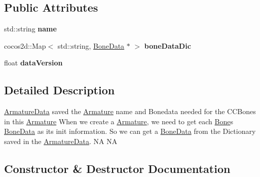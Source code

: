\subsection*{Public Attributes}
\begin{DoxyCompactItemize}
\item 
\mbox{\label{classcocostudio_1_1ArmatureData_a997df346d11f7e3be5c8aadd697f4727}} 
std\+::string {\bfseries name}
\item 
\mbox{\label{classcocostudio_1_1ArmatureData_a75a5e66549da2b70140418db0f3bff85}} 
cocos2d\+::\+Map$<$ std\+::string, \hyperlink{classcocostudio_1_1BoneData}{Bone\+Data} $\ast$ $>$ {\bfseries bone\+Data\+Dic}
\item 
\mbox{\label{classcocostudio_1_1ArmatureData_a831865b04219aa33bd16e1a13b33bb7a}} 
float {\bfseries data\+Version}
\end{DoxyCompactItemize}


\subsection{Detailed Description}
\hyperlink{classcocostudio_1_1ArmatureData}{Armature\+Data} saved the \hyperlink{classcocostudio_1_1Armature}{Armature} name and Bonedata needed for the C\+C\+Bones in this \hyperlink{classcocostudio_1_1Armature}{Armature} When we create a \hyperlink{classcocostudio_1_1Armature}{Armature}, we need to get each \hyperlink{classcocostudio_1_1Bone}{Bone}\textquotesingle{}s \hyperlink{classcocostudio_1_1BoneData}{Bone\+Data} as it\textquotesingle{}s init information. So we can get a \hyperlink{classcocostudio_1_1BoneData}{Bone\+Data} from the Dictionary saved in the \hyperlink{classcocostudio_1_1ArmatureData}{Armature\+Data}.  NA  NA 

\subsection{Constructor \& Destructor Documentation}
\mbox{\label{classcocostudio_1_1ArmatureData_ad1337e328d9ed97b442eb85d7705d2c9}} 
